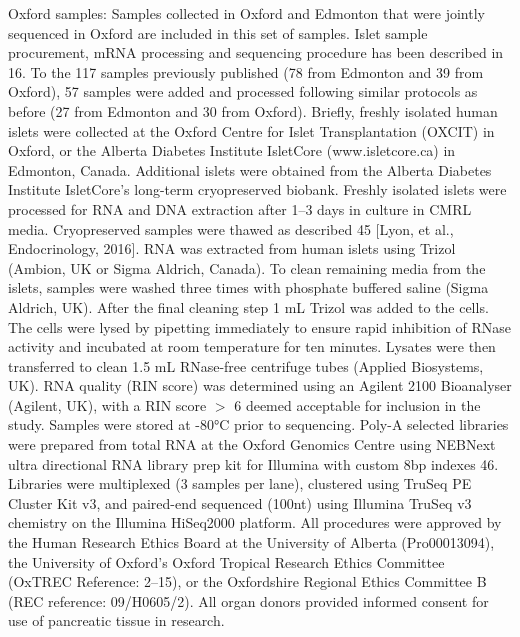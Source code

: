 Oxford samples: Samples collected in Oxford and Edmonton that were jointly sequenced in Oxford are included in this set of samples. Islet sample procurement, mRNA processing and sequencing procedure has been described in 16. To the 117 samples previously published (78 from Edmonton and 39 from Oxford), 57 samples were added and processed following similar protocols as before (27 from Edmonton and 30 from Oxford). Briefly, freshly isolated human islets were collected at the Oxford Centre for Islet Transplantation (OXCIT) in Oxford, or the Alberta Diabetes Institute IsletCore (www.isletcore.ca) in Edmonton, Canada. Additional islets were obtained from the Alberta Diabetes Institute IsletCore’s long-term cryopreserved biobank. Freshly isolated islets were processed for RNA and DNA extraction after 1–3 days in culture in CMRL media. Cryopreserved samples were thawed as described 45 [Lyon, et al., Endocrinology, 2016]. RNA was extracted from human islets using Trizol (Ambion, UK or Sigma Aldrich, Canada). To clean remaining media from the islets, samples were washed three times with phosphate buffered saline (Sigma Aldrich, UK). After the final cleaning step 1 mL Trizol was added to the cells. The cells were lysed by pipetting immediately to ensure rapid inhibition of RNase activity and incubated at room temperature for ten minutes. Lysates were then transferred to clean 1.5 mL RNase-free centrifuge tubes (Applied Biosystems, UK). RNA quality (RIN score) was determined using an Agilent 2100 Bioanalyser (Agilent, UK), with a RIN score $>$ 6 deemed acceptable for inclusion in the study. Samples were stored at -80°C prior to sequencing. Poly-A selected libraries were prepared from total RNA at the Oxford Genomics Centre using NEBNext ultra directional RNA library prep kit for Illumina with custom 8bp indexes 46. Libraries were multiplexed (3 samples per lane), clustered using TruSeq PE Cluster Kit v3, and paired-end sequenced (100nt) using Illumina TruSeq v3 chemistry on the Illumina HiSeq2000 platform. All procedures were approved by the Human Research Ethics Board at the University of Alberta (Pro00013094), the University of Oxford's Oxford Tropical Research Ethics Committee (OxTREC Reference: 2–15), or the Oxfordshire Regional Ethics Committee B (REC reference: 09/H0605/2). All organ donors provided informed consent for use of pancreatic tissue in research.
